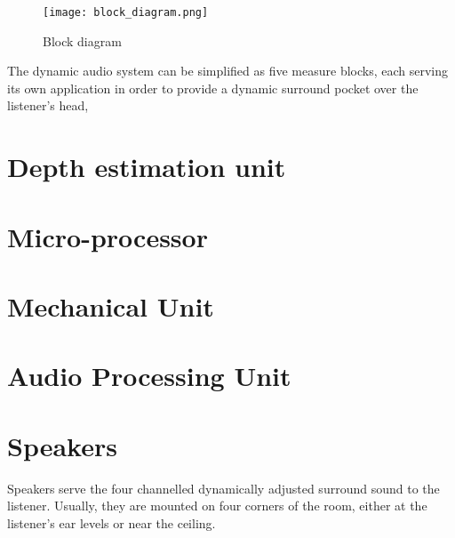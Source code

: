 \documentclass[../../../patent_v1.tex]{subfiles}
\begin{document}
\begin{figure*}
    \texttt{[image: block\_diagram.png]}
    \caption{Block diagram}
\end{figure*}

\FloatBarrier

The dynamic audio system can be simplified as five measure blocks, each serving its 
own application in order to provide a dynamic surround pocket over the listener's head,

\section{Depth estimation unit}



\section{Micro-processor}



\section{Mechanical Unit}



\section{Audio Processing Unit}



\section{Speakers}

Speakers serve the four channelled dynamically adjusted surround sound to the listener. 
Usually, they are mounted on four corners of the room, either at the listener's ear 
levels or near the ceiling.
\end{document}
